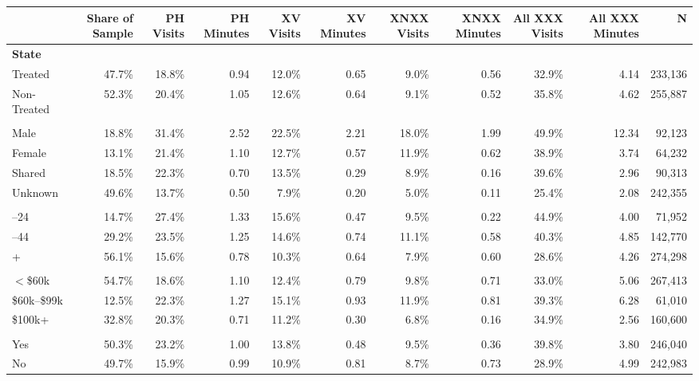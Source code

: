 \begin{tabular}{lrrrrrrrrrr}
\toprule
 & Share of Sample & PH Visits & PH Minutes & XV Visits & XV Minutes & XNXX Visits & XNXX Minutes & All XXX Visits & All XXX Minutes & N \\
\midrule
\multicolumn{11}{l}{\textbf{State}} \\
\quad Treated & 47.7\% & 18.8\% & 0.94 & 12.0\% & 0.65 & 9.0\% & 0.56 & 32.9\% & 4.14 & 233,136 \\
\quad Non-Treated & 52.3\% & 20.4\% & 1.05 & 12.6\% & 0.64 & 9.1\% & 0.52 & 35.8\% & 4.62 & 255,887 \\
\addlinespace
\multicolumn{11}{l}{\textbf{Gender}} \\
\quad Male & 18.8\% & 31.4\% & 2.52 & 22.5\% & 2.21 & 18.0\% & 1.99 & 49.9\% & 12.34 & 92,123 \\
\quad Female & 13.1\% & 21.4\% & 1.10 & 12.7\% & 0.57 & 11.9\% & 0.62 & 38.9\% & 3.74 & 64,232 \\
\quad Shared & 18.5\% & 22.3\% & 0.70 & 13.5\% & 0.29 & 8.9\% & 0.16 & 39.6\% & 2.96 & 90,313 \\
\quad Unknown & 49.6\% & 13.7\% & 0.50 & 7.9\% & 0.20 & 5.0\% & 0.11 & 25.4\% & 2.08 & 242,355 \\
\addlinespace
\multicolumn{11}{l}{\textbf{Age}} \\
\quad 18--24 & 14.7\% & 27.4\% & 1.33 & 15.6\% & 0.47 & 9.5\% & 0.22 & 44.9\% & 4.00 & 71,952 \\
\quad 25--44 & 29.2\% & 23.5\% & 1.25 & 14.6\% & 0.74 & 11.1\% & 0.58 & 40.3\% & 4.85 & 142,770 \\
\quad 45+ & 56.1\% & 15.6\% & 0.78 & 10.3\% & 0.64 & 7.9\% & 0.60 & 28.6\% & 4.26 & 274,298 \\
\addlinespace
\multicolumn{11}{l}{\textbf{Household Income}} \\
\quad $<$\$60k & 54.7\% & 18.6\% & 1.10 & 12.4\% & 0.79 & 9.8\% & 0.71 & 33.0\% & 5.06 & 267,413 \\
\quad \$60k--\$99k & 12.5\% & 22.3\% & 1.27 & 15.1\% & 0.93 & 11.9\% & 0.81 & 39.3\% & 6.28 & 61,010 \\
\quad \$100k+ & 32.8\% & 20.3\% & 0.71 & 11.2\% & 0.30 & 6.8\% & 0.16 & 34.9\% & 2.56 & 160,600 \\
\addlinespace
\multicolumn{11}{l}{\textbf{Children Present}} \\
\quad Yes & 50.3\% & 23.2\% & 1.00 & 13.8\% & 0.48 & 9.5\% & 0.36 & 39.8\% & 3.80 & 246,040 \\
\quad No & 49.7\% & 15.9\% & 0.99 & 10.9\% & 0.81 & 8.7\% & 0.73 & 28.9\% & 4.99 & 242,983 \\

\end{tabular}
